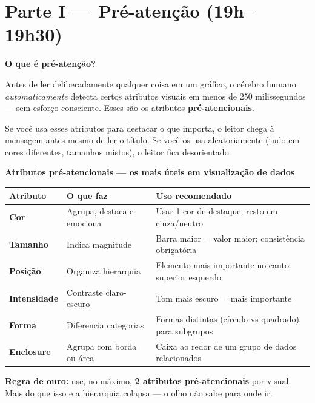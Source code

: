 \section{Parte I — Pré-atenção (19h–19h30)}

\begin{SolvedBox}
\textbf{O que é pré-atenção?}

Antes de ler deliberadamente qualquer coisa em um gráfico, o cérebro
humano \emph{automaticamente} detecta certos atributos visuais em menos
de 250 milissegundos — sem esforço consciente. Esses são os atributos
\textbf{pré-atencionais}.

Se você usa esses atributos para destacar o que importa, o leitor chega
à mensagem antes mesmo de ler o título. Se você os usa aleatoriamente
(tudo em cores diferentes, tamanhos mistos), o leitor fica desorientado.
\end{SolvedBox}

\begin{BoardBox}
\textbf{Atributos pré-atencionais — os mais úteis em visualização de dados}

\begin{tabular}{|l|p{5.5cm}|p{5cm}|}
\hline
\textbf{Atributo} & \textbf{O que faz} & \textbf{Uso recomendado} \\
\hline
\textbf{Cor} & Agrupa, destaca e emociona & Usar 1 cor de destaque; resto em cinza/neutro \\
\textbf{Tamanho} & Indica magnitude & Barra maior = valor maior; consistência obrigatória \\
\textbf{Posição} & Organiza hierarquia & Elemento mais importante no canto superior esquerdo \\
\textbf{Intensidade} & Contraste claro-escuro & Tom mais escuro = mais importante \\
\textbf{Forma} & Diferencia categorias & Formas distintas (círculo vs quadrado) para subgrupos \\
\textbf{Enclosure} & Agrupa com borda ou área & Caixa ao redor de um grupo de dados relacionados \\
\hline
\end{tabular}

\textbf{Regra de ouro:} use, no máximo, \textbf{2 atributos pré-atencionais} por visual.
Mais do que isso e a hierarquia colapsa — o olho não sabe para onde ir.
\end{BoardBox}

